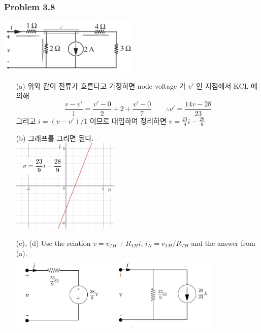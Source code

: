 \documentclass[13pt]{article}
\begin{document}
\subsubsection*{Problem 3.8}
\includegraphics[width=0.5\textwidth, center]{p3_8}
\begin{itemize}
\item[(a)] 위와 같이 전류가 흐른다고 가정하면 node voltage 가 $v'$ 인 지점에서 KCL 에 의해 $$\frac{v-v'}{1} = \frac{v'-0}{2} + 2 + \frac{v'-0}{7} \qquad \therefore v'=\frac{14v-28}{23}$$
그리고 $i = (v-v')/1$ 이므로 대입하여 정리하면 $\displaystyle \boxed{v = \frac{23}{9}i - \frac{28}{9}}$

\item[(b)] 그래프를 그리면 된다.\\
\includegraphics[width=0.4\textwidth, center]{p3_8b}
\item[(c), (d)] Use the relation $v = v_{TH} + R_{TH}i$, $i_N = v_{TH} / R_{TH}$ and the answer from (a).\\
\includegraphics[width=0.8\textwidth, center]{p3_8cd}
\end{itemize}
\end{document}
